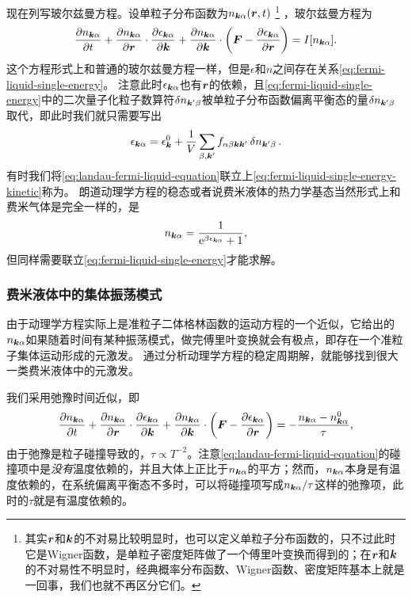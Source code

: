现在列写玻尔兹曼方程。设单粒子分布函数为$n_{\vb*{k} \alpha}(\vb*{r}, t)$%
\footnote{
    其实$\vb*{r}$和$\vb*{k}$的不对易比较明显时，也可以定义单粒子分布函数的，只不过此时它是Wigner函数，是单粒子密度矩阵做了一个傅里叶变换而得到的；在$\vb*{r}$和$\vb*{k}$的不对易性不明显时，经典概率分布函数、Wigner函数、密度矩阵基本上就是一回事，我们也就不再区分它们。
}%
，玻尔兹曼方程为
\begin{equation}
    \pdv{n_{\vb*{k} \alpha}}{t} + \pdv{n_{\vb*{k} \alpha}}{\vb*{r}} \cdot \pdv{\epsilon_{\vb*{k} \alpha}}{\vb*{k}} + \pdv{n_{\vb*{k} \alpha}}{\vb*{k}} \cdot \left( \vb*{F} - \pdv{\epsilon_{\vb*{k} \alpha}}{\vb*{r}} \right) = I[n_{\vb*{k} \alpha}]. 
    \label{eq:landau-fermi-liquid-equation}
\end{equation}
这个方程形式上和普通的玻尔兹曼方程一样，但是$\epsilon$和$n$之间存在关系\eqref{eq:fermi-liquid-single-energy}。
注意此时$\epsilon_{\vb*{k} \alpha}$也有$\vb*{r}$的依赖，且\eqref{eq:fermi-liquid-single-energy}中的二次量子化粒子数算符$\var{n_{\vb*{k}' \beta}}$被单粒子分布函数偏离平衡态的量$\var{n_{\vb*{k}' \beta}}$取代，即此时我们就只需要写出
\begin{equation}
    \epsilon_{\vb*{k} \alpha} = \epsilon_{\vb*{k}}^0 + \frac{1}{V} \sum_{\beta, \vb*{k}'} f_{\alpha \beta \vb*{k} \vb*{k}'} \var{n_{\vb*{k}' \beta}}.
    \label{eq:fermi-liquid-single-energy-kinetic}
\end{equation}
有时我们将\eqref{eq:landau-fermi-liquid-equation}联立上\eqref{eq:fermi-liquid-single-energy-kinetic}称为。
朗道动理学方程的稳态或者说费米液体的热力学基态当然形式上和费米气体是完全一样的，是
\begin{equation}
    n_{\vb*{k} \alpha} = \frac{1}{\mathrm{e}^{\beta \epsilon_{\vb*{k} \alpha}} + 1},
    \label{eq:fermi-liquid-stable-state}
\end{equation}
但同样需要联立\eqref{eq:fermi-liquid-single-energy}才能求解。

\subsubsection{费米液体中的集体振荡模式}

由于动理学方程实际上是准粒子二体格林函数的运动方程的一个近似，它给出的$n_{\vb*{k} \alpha}$如果随着时间有某种振荡模式，做完傅里叶变换就会有极点，即存在一个准粒子集体运动形成的元激发。
通过分析动理学方程的稳定周期解，就能够找到很大一类费米液体中的元激发。

我们采用弛豫时间近似，即
\begin{equation}
    \pdv{n_{\vb*{k} \alpha}}{t} + \pdv{n_{\vb*{k} \alpha}}{\vb*{r}} \cdot \pdv{\epsilon_{\vb*{k} \alpha}}{\vb*{k}} + \pdv{n_{\vb*{k} \alpha}}{\vb*{k}} \cdot \left( \vb*{F} - \pdv{\epsilon_{\vb*{k} \alpha}}{\vb*{r}} \right) = - \frac{n_{\vb*{k} \alpha} - n_{\vb*{k} \alpha}^0}{\tau},
    \label{eq:landau-equation-damping}
\end{equation}
由于弛豫是粒子碰撞导致的，$\tau \propto T^{-2}$。注意\eqref{eq:landau-fermi-liquid-equation}的碰撞项中是\emph{没有}温度依赖的，并且大体上正比于$n_{\vb*{k} \alpha}$的平方；然而，$n_{\vb*{k} \alpha}$本身是有温度依赖的，在系统偏离平衡态不多时，可以将碰撞项写成$n_{\vb*{k} \alpha} / \tau$这样的弛豫项，此时的$\tau$就是有温度依赖的。


